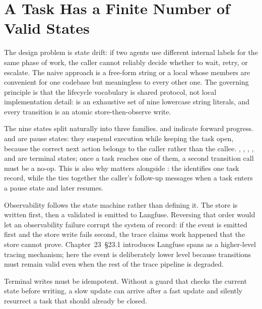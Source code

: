 \section{A Task Has a Finite Number of Valid States}
\label{sec:a2a-lifecycle}

The design problem is state drift: if two agents use different internal
labels for the same phase of work, the caller cannot reliably decide
whether to wait, retry, or escalate. The naive approach is a free-form
 string or a local  whose members are convenient
for one codebase but meaningless to every other one. The governing
principle is that the lifecycle vocabulary is shared protocol, not local
implementation detail:  is an exhaustive set of nine
lowercase string literals, and every transition is an atomic
store-then-observe write.

The nine states split naturally into three families. 
and  indicate forward progress. 
and  are pause states: they suspend execution while
keeping the task open, because the correct next action belongs to the
caller rather than the callee. , ,
, , and  are terminal
states; once a task reaches one of them, a second transition call must be
a no-op. This is also why  matters alongside
: the  identifies one task record, while the
 ties together the caller's follow-up messages when a task
enters a pause state and later resumes.

Observability follows the state machine rather than defining it. The store
is written first, then a validated  is emitted to
Langfuse. Reversing that order would let an observability failure corrupt
the system of record: if the event is emitted first and the store write
fails second, the trace claims work happened that the store cannot prove.
Chapter~23~\S23.1 introduces Langfuse spans as a higher-level tracing
mechanism; here the event is deliberately lower level because transitions
must remain valid even when the rest of the trace pipeline is degraded.

\begin{warningbox}
Terminal writes must be idempotent. Without a guard that checks the
current state before writing, a slow  update can arrive
after a fast  update and silently resurrect a task that
should already be closed.
\end{warningbox}

